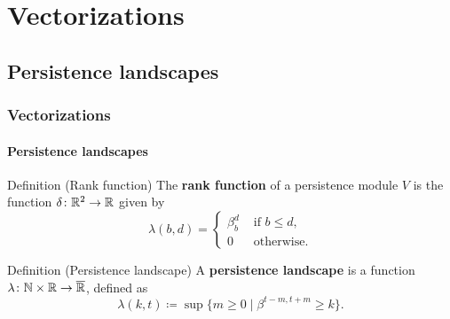 \documentclass[aspectratio=169]{beamer}
\begin{document}
\section{Vectorizations}
\subsection{Persistence landscapes}

\begin{frame}
  \frametitle{Vectorizations}
  \framesubtitle{Persistence landscapes}
  \begin{block}{Definition (Rank function)}
    The {\bf rank function} of a persistence module $ V $ is the function $ \delta \colon \mathbb R^2 \to \mathbb R $ given by
    \begin{equation}
        \lambda(b, d) = \begin{cases}
            \beta_b^d &\text{ if }  b \leq d, \\
            0 &\text{ otherwise}.
        \end{cases}
    \end{equation}
  \end{block}
  \pause
  \begin{block}{Definition (Persistence landscape)}
    A {\bf persistence landscape} is a function $ \lambda \colon \mathbb N \times \mathbb R \to \overline {\mathbb R} $, defined as
    \begin{equation}
        \lambda(k, t) \coloneq \sup \{ m \geq 0 \mid \beta^{t-m, t+m} \geq k\}.
    \end{equation}
  \end{block}
\end{frame}
\end{document}
